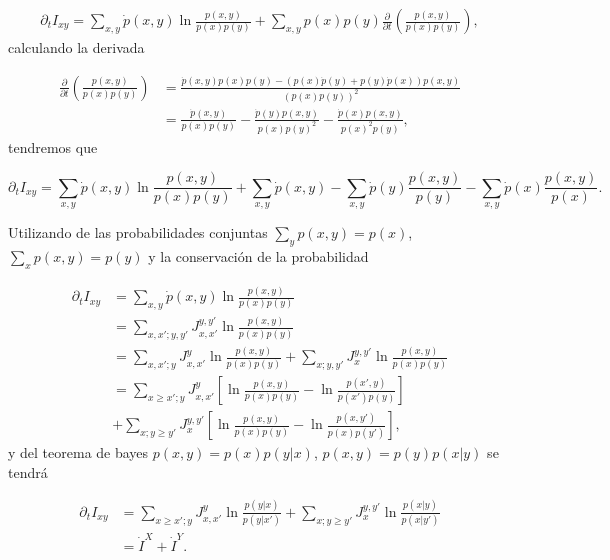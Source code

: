 \begin{appendixs}
\begin{align*}
    \partial_{t} I_{xy} = \sum_{x,y}\dot{p}(x,y) \ln \frac{p(x,y) }{ p(x)p(y) } + \sum_{x,y}p(x)p(y) \frac{\partial}{\partial t} \left( \frac{p(x,y)}{p(x)p(y)} \right),
 \end{align*}
calculando la derivada

\begin{align*}
    \frac{\partial }{\partial t} \left( \frac{p(x,y)}{p(x)p(y)} \right) & = \frac{ \dot{p}(x,y)p(x)p(y) - (p(x)\dot{p}(y) + p(y)\dot{p}(x))p(x,y)   }{ (p(x)p(y))^{2} } \\
    & = \frac{\dot{p}(x,y)}{p(x)p(y) } - \frac{\dot{p}(y)p(x,y)  }{ p(x)p(y)^{2} } - \frac{\dot{p}(x)p(x,y)  }{ p(x)^{2}p(y) },  
\end{align*}
tendremos que

\begin{equation*}
    \partial_{t}I_{xy} = \sum_{x,y}\dot{p}(x,y) \ln \frac{p(x,y)}{ p(x)p(y) } + \sum_{x,y} \dot{p}(x,y) - \sum_{x,y} \dot{p}(y) \frac{p(x,y)}{p(y)} - \sum_{x,y} \dot{p}(x) \frac{p(x,y)}{p(x)}. 
\end{equation*}

Utilizando de las probabilidades conjuntas $\sum_{y}p(x,y) = p(x)$, $\sum_{x}p(x,y)  = p(y)$ y la conservación de la probabilidad

\begin{align*}
    \partial_{t}I_{xy} & = \sum_{x,y}\dot{p}(x,y) \ln \frac{p(x,y)}{ p(x)p(y) } \\
    & = \sum_{x,x';y,y'}J_{x,x'}^{y,y'} \ln \frac{p(x,y)}{ p(x)p(y) } \\
    & = \sum_{x,x';y}J_{x,x'}^{y} \ln \frac{p(x,y)}{p(x)p(y)} + \sum_{x;y,y'}J_{x}^{y,y'} \ln \frac{p(x,y)}{p(x)p(y)} \\
    & = \sum_{x\geq x';y}J_{x,x'}^{y} \left[ \ln \frac{p(x,y)}{p(x)p(y)} - \ln \frac{p(x',y)}{p(x')p(y)}  \right] \\
    & + \sum_{x;y\geq y'} J_{x}^{y,y'} \left[ \ln \frac{p(x,y)}{p(x)p(y)} - \ln \frac{p(x,y')}{p(x)p(y')} \right],
\end{align*}
y del teorema de bayes $p(x,y) = p(x)p(y|x)$, $p(x,y) = p(y)p(x|y)$ se tendrá

\begin{align*}
    \partial_{t}I_{xy} & = \sum_{x \geq x';y} J_{x,x'}^{y} \ln \frac{p(y|x) }{p(y|x')} + \sum_{x;y\geq y'} J_{x}^{y,y'} \ln \frac{p(x|y) }{p(x|y')} \\
                       & = \dot{I}^{X} + \dot{I}^{Y}. 
\end{align*}


\end{appendixs}

